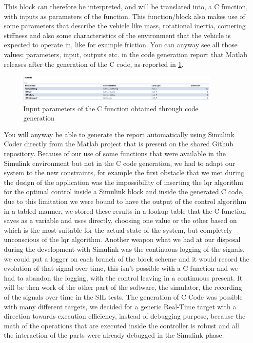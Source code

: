This block can therefore be interpreted, and will be translated into, a C function, with inputs as parameters of the function. This function/block also makes use of some parameters that describe the vehicle like mass, rotational inertia, cornering stiffness and also some characteristics of the environment that the vehicle is expected to operate in, like for example friction. You can anyway see all those values: parameters, input, outputs etc. in the code generation report that Matlab releases after the generation of the C code, as reported in \ref{Codegen Inports}. 
\begin{figure} \label{Codegen Inports}
		\centering
		\includegraphics[width=0.9\textwidth]{Images/Simulator/codegen-inports}
		\caption{Input parameters of the C function obtained through code generation}	
\end{figure}
You will anyway be able to generate the report automatically using Simulink Coder directly from the Matlab project that is present on the shared Github repository. Because of our use of some functions that were available in the Simulink environment but not in the C code generation, we had to adapt our system to the new constraints, for example the first obstacle that we met during the design of the application was the impossibility of inserting the lqr algorithm for the optimal control inside a Simulink block and inside the generated C code, due to this limitation we were bound to have the output of the control algorithm in a tabled manner, we stored these results in a lookup table that the C function saves as a variable and uses directly, choosing one value or the other based on which is the most suitable for the actual state of the system, but completely unconscious of the lqr algorithm. Another weapon what we had at our disposal during the development with Simulink was the continuous logging of the signals, we could put a logger on each branch of the block scheme and it would record the evolution of that signal over time, this isn't possible with a C function and we had to abandon the logging, with the control leaving in a continuous present. It will be then work of the other part of the software, the simulator, the recording of the signals over time in the SIL tests. The generation of C Code was possible with many different targets, we decided for  a generic Real-Time target with a direction towards execution efficiency, instead of debugging purpose, because the math of the operations that are executed inside the controller is robust and all the interaction of the parts were already debugged in the Simulink phase.
